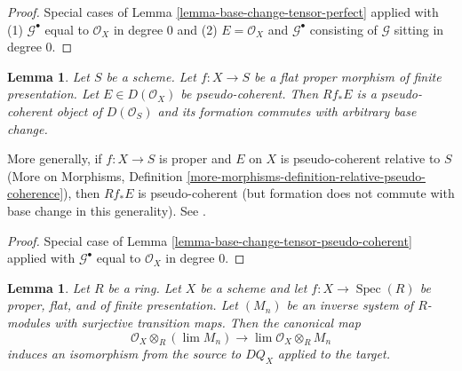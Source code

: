 \documentclass{stacks-project}
\theoremstyle{plain}
\newtheorem{lemma}[subsection]{Lemma}
\theoremstyle{definition}
\theoremstyle{remark}
\numberwithin{equation}{subsection}
\def\lim{\mathop{\mathrm{lim}}\nolimits}
\def\Spec{\mathop{\mathrm{Spec}}}
\begin{document}
\begin{proof}
Special cases of
Lemma \ref{lemma-base-change-tensor-perfect} applied with
(1) $\mathcal{G}^\bullet$ equal to $\mathcal{O}_X$ in degree $0$
and (2) $E = \mathcal{O}_X$ and $\mathcal{G}^\bullet$ consisting
of $\mathcal{G}$ sitting in degree $0$.
\end{proof}

\begin{lemma}
\label{lemma-flat-proper-pseudo-coherent-direct-image-general}
Let $S$ be a scheme. Let $f : X \to S$ be a flat proper
morphism of finite presentation. Let $E \in D(\mathcal{O}_X)$
be pseudo-coherent. Then $Rf_*E$ is a pseudo-coherent object of
$D(\mathcal{O}_S)$ and its formation commutes with arbitrary base change.
\end{lemma}

\noindent
More generally, if $f : X \to S$ is proper and $E$ on $X$ is pseudo-coherent
relative to $S$ (More on Morphisms, Definition
\ref{more-morphisms-definition-relative-pseudo-coherence}),
then $Rf_*E$ is pseudo-coherent
(but formation does not commute with base change in this generality).
See \cite{Kiehl}.

\begin{proof}
Special case of
Lemma \ref{lemma-base-change-tensor-pseudo-coherent} applied with
$\mathcal{G}^\bullet$ equal to $\mathcal{O}_X$ in degree $0$.
\end{proof}

\begin{lemma}
\label{lemma-pullback-and-limits}
Let $R$ be a ring. Let $X$ be a scheme and let
$f : X \to \Spec(R)$ be proper, flat, and
of finite presentation. Let $(M_n)$ be an inverse
system of $R$-modules with surjective transition maps.
Then the canonical map
$$
\mathcal{O}_X \otimes_R (\lim M_n)
\longrightarrow
\lim \mathcal{O}_X \otimes_R M_n
$$
induces an isomorphism from the source to $DQ_X$ applied to the target.
\end{lemma}
\end{document}

